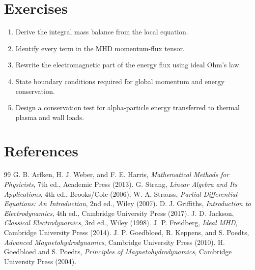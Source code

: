 \documentclass[11pt]{article}
\begin{document}
\section{Exercises}
\begin{enumerate}[leftmargin=1.8em]
\item Derive the integral mass balance from the local equation.
\item Identify every term in the MHD momentum-flux tensor.
\item Rewrite the electromagnetic part of the energy flux using ideal Ohm's law.
\item State boundary conditions required for global momentum and energy conservation.
\item Design a conservation test for alpha-particle energy transferred to thermal plasma and wall loads.
\end{enumerate}

\section{References}
\begin{thebibliography}{99}
 G. B. Arfken, H. J. Weber, and F. E. Harris, \emph{Mathematical Methods for Physicists}, 7th ed., Academic Press (2013).
 G. Strang, \emph{Linear Algebra and Its Applications}, 4th ed., Brooks/Cole (2006).
 W. A. Strauss, \emph{Partial Differential Equations: An Introduction}, 2nd ed., Wiley (2007).
 D. J. Griffiths, \emph{Introduction to Electrodynamics}, 4th ed., Cambridge University Press (2017).
 J. D. Jackson, \emph{Classical Electrodynamics}, 3rd ed., Wiley (1998).
 J. P. Freidberg, \emph{Ideal MHD}, Cambridge University Press (2014).
 J. P. Goedbloed, R. Keppens, and S. Poedts, \emph{Advanced Magnetohydrodynamics}, Cambridge University Press (2010).
 H. Goedbloed and S. Poedts, \emph{Principles of Magnetohydrodynamics}, Cambridge University Press (2004).
\end{thebibliography}
\end{document}
